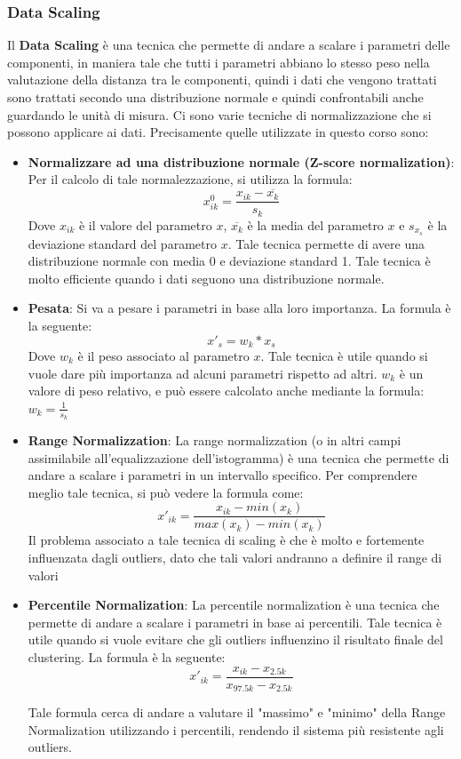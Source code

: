 \subsubsection{Data Scaling}
Il \textbf{Data Scaling} è una tecnica che permette di andare a scalare i parametri delle componenti, in maniera tale che tutti i parametri abbiano lo stesso peso nella valutazione della distanza tra le componenti, quindi i dati che vengono trattati sono trattati secondo una distribuzione normale e quindi confrontabili anche guardando le unità di misura. Ci sono varie tecniche di normalizzazione che si possono applicare ai dati. Precisamente quelle utilizzate in questo corso sono:
\begin{itemize}
\item \textbf{Normalizzare ad una distribuzione normale (Z-score normalization)}: Per il calcolo di tale normalezzazione, si utilizza la formula:
\[x^0_{ik} = \frac{x_{ik} - \overline{x_{k}}}{s_{k}}\]
Dove \(x_{ik}\) è il valore del parametro \(x\), \(\overline{x_{k}}\) è la media del parametro \(x\) e \(s_{x_s}\) è la deviazione standard del parametro \(x\). Tale tecnica permette di avere una distribuzione normale con media 0 e deviazione standard 1. Tale tecnica è molto efficiente quando i dati seguono una distribuzione normale.

\item \textbf{Pesata}: Si va a pesare i parametri in base alla loro importanza. La formula è la seguente:
\[x'_s = w_k * x_s\]
Dove \(w_k\) è il peso associato al parametro \(x\). Tale tecnica è utile quando si vuole dare più importanza ad alcuni parametri rispetto ad altri. \(w_k\) è un valore di peso relativo, e può essere calcolato anche mediante la formula: \(w_k=\frac{1}{s_k}\)

\item \textbf{Range Normalizzation}: La range normalizzation (o in altri campi assimilabile all'equalizzazione dell'istogramma) è una tecnica che permette di andare a scalare i parametri in un intervallo specifico. Per comprendere meglio tale tecnica, si può vedere la formula come: 
\[
x'_{ik} = \frac{x_{ik} - min(x_k)}{max(x_k) - min(x_k)}
\]
Il problema associato a tale tecnica di scaling è che è molto e fortemente influenzata dagli outliers, dato che tali valori andranno a definire il range di valori

\item \textbf{Percentile Normalization}: La percentile normalization è una tecnica che permette di andare a scalare i parametri in base ai percentili. Tale tecnica è utile quando si vuole evitare che gli outliers influenzino il risultato finale del clustering. La formula è la seguente:
\[
x'_{ik} = \frac{x_{ik} - x_{2.5k}}{x_{97.5k} - x_{2.5k}}
\]

Tale formula cerca di andare a valutare il "massimo" e "minimo" della Range Normalization utilizzando i percentili, rendendo il sistema più resistente agli outliers.
\end{itemize}

